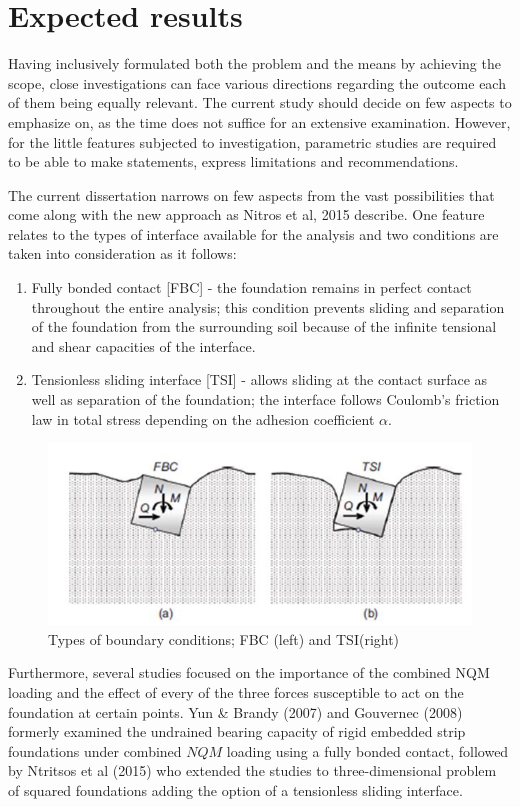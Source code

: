 \documentclass[10pt,a4paper]{report}
\begin{document}
\section{Expected results}
Having inclusively formulated both the problem and the means by achieving the scope, close investigations can face various directions regarding the outcome each of them being equally relevant. The current study should decide on few aspects to emphasize on, as the time does not suffice for an extensive examination. However, for the little features subjected to investigation, parametric studies are required to be able to make statements, express limitations and recommendations.

The current dissertation narrows on few aspects from the vast possibilities that come along with the new approach as Nitros et al, 2015 describe. One feature relates to the types of interface available for the analysis and two conditions are taken into consideration as it follows:
\begin{enumerate}
	\item Fully bonded contact [FBC] - the foundation remains in perfect contact throughout the entire analysis; this condition prevents sliding and separation of the foundation from the surrounding soil because of the infinite tensional and shear capacities of the interface.
	\item Tensionless sliding interface [TSI] - allows sliding at the contact surface as well as separation of the foundation; the interface follows Coulomb's friction law in total stress depending on the adhesion coefficient $\alpha$.
\end{enumerate}

\begin{figure}[h!]
	\centering
	\includegraphics[width=0.8\linewidth]{"fbc"}
	\caption{Types of boundary conditions; FBC (left) and TSI(right)}
	\label{FBC}
\end{figure}
Furthermore, several studies focused on the importance of the combined NQM loading and the effect of every of the three forces susceptible to act on the foundation at certain points. Yun \& Brandy (2007) and Gouvernec (2008) formerly examined the undrained bearing capacity of rigid embedded strip foundations under combined $NQM$ loading using a fully bonded contact, followed by Ntritsos et al (2015) who extended the studies to three-dimensional problem of squared foundations adding the option of a tensionless sliding interface.
\end{document}
